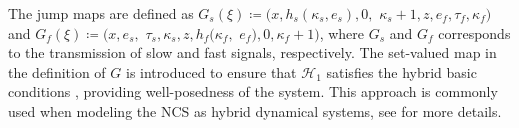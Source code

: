 The jump maps are defined as $G_s(\xi) \coloneqq (x,h_s(\kappa_s, e_s),0,$ $ \kappa_s + 1, z, e_f,  \tau_f,  \kappa_f)$ and $G_f(\xi) \coloneqq(x, e_s, $ $\tau_s,\kappa_s,  z,  h_f(\kappa_f,$ $ e_f),  0,  \kappa_f + 1 )$, where $G_s$ and $G_f$ corresponds to the transmission of slow and fast signals, respectively. 
The set-valued map in the definition of $G$
is introduced to ensure that $\mathcal{H}_1$ satisfies the hybrid basic conditions \cite[Assumption 6.5]{gosate12}, providing well-posedness of the system. This approach is commonly used when modeling the NCS as hybrid dynamical systems, see \cite{abdelrahim2017robust,wang2015emulation} for more details.
%






